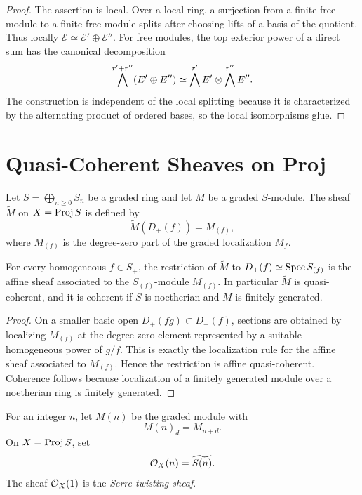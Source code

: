 \begin{proof}
The assertion is local.  Over a local ring, a surjection from a finite free
module to a finite free module splits after choosing lifts of a basis of the
quotient.  Thus locally
\(\mathcal E\simeq\mathcal E'\oplus\mathcal E''\).  For free modules, the top
exterior power of a direct sum has the canonical decomposition
\[
    \bigwedge^{r'+r''}(E'\oplus E'')
    \simeq
    \bigwedge^{r'}E'\otimes \bigwedge^{r''}E''.
\]
The construction is independent of the local splitting because it is
characterized by the alternating product of ordered bases, so the local
isomorphisms glue.
\end{proof}

\section{Quasi-Coherent Sheaves on Proj}

\begin{definition}
Let \(S=\bigoplus_{n\ge0}S_n\) be a graded ring and let \(M\) be a graded
\(S\)-module.  The sheaf \(\widetilde M\) on \(X=\operatorname{Proj} S\) is defined by
\[
    \widetilde M(D_+(f))=M_{(f)},
\]
where \(M_{(f)}\) is the degree-zero part of the graded localization \(M_f\).
\end{definition}

\begin{proposition}
For every homogeneous \(f\in S_+\), the restriction of \(\widetilde M\) to
\(D_+(f)\simeq\operatorname{Spec} S_{(f)}\) is the affine sheaf associated to the
\(S_{(f)}\)-module \(M_{(f)}\).  In particular \(\widetilde M\) is
quasi-coherent, and it is coherent if \(S\) is noetherian and \(M\) is finitely
generated.
\end{proposition}

\begin{proof}
On a smaller basic open \(D_+(fg)\subset D_+(f)\), sections are obtained by
localizing \(M_{(f)}\) at the degree-zero element represented by a suitable
homogeneous power of \(g/f\).  This is exactly the localization rule for the
affine sheaf associated to \(M_{(f)}\).  Hence the restriction is affine
quasi-coherent.  Coherence follows because localization of a finitely generated
module over a noetherian ring is finitely generated.
\end{proof}

\begin{definition}
For an integer \(n\), let \(M(n)\) be the graded module with
\[
    M(n)_d=M_{n+d}.
\]
On \(X=\operatorname{Proj} S\), set
\[
    \mathcal{O}_X(n)=\widetilde{S(n)}.
\]
The sheaf \(\mathcal{O}_X(1)\) is the \emph{Serre twisting sheaf}.
\end{definition}


